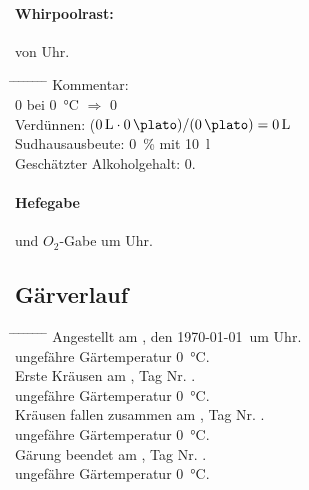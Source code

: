 \documentclass[12pt,oneside,a4paper]{scrartcl}
\begin{document}
{\paragraph{Whirpoolrast:} von Uhr.
	\begin{tabbing}
		\hspace{1cm} \= \hspace{1cm} \= \hspace{1cm} \= \hspace{1cm} \= \hspace{1cm} \= \hspace{1cm} \= \hspace{1cm} \= \hspace{1cm} \= \kill
		\> Kommentar: \>\>\> \\
		\> \> \> \SI{0}{\plato} \> bei \> \SI{0}{\degreeCelsius} \> $\Rightarrow$ \> \SI{0}{\plato}\\
		\> \> Verdünnen: \> \> \> \> \> ($\SI{0}{\litre} \cdot \SI{0}{\plato})/(\SI{0}{\plato})= \SI{0}{\litre}$\\
		\> \> Sudhausausbeute: \> \> \> \> \> \SI{0}{\percent} mit \SI{10}{\litre}\\
		\> \> Geschätzter Alkoholgehalt: \> \> \> \> \> \SI{0}{\pervol}.
	\end{tabbing}
%
\paragraph{Hefegabe} und $O_2$-Gabe um  Uhr.
%
\subsection*{Gärverlauf}
	\begin{tabbing}
		\hspace{1cm} \= \hspace{1cm} \= \hspace{1cm} \= \hspace{1cm} \= \hspace{1cm} \= \hspace{1cm} \= \hspace{1cm} \= \hspace{1cm} \= \kill
		\> Angestellt am , den \today \ um  Uhr.\\
		\> \> ungefähre Gärtemperatur \SI{0}{\degreeCelsius}.\\
		\> Erste Kräusen am \hspace{4cm}, Tag Nr.\hspace{2.5cm} .\\
		\> \> ungefähre Gärtemperatur \SI{0}{\degreeCelsius}.\\
		\> Kräusen fallen zusammen am \hspace{4cm}, Tag Nr. \hspace{2.5cm}.\\
		\> \> ungefähre Gärtemperatur \SI{0}{\degreeCelsius}.\\
		\> Gärung beendet am \hspace{4cm}, Tag Nr. \hspace{2.5cm}.\\
		\> \> ungefähre Gärtemperatur \SI{0}{\degreeCelsius}.
	\end{tabbing}
%
}
\end{document}
